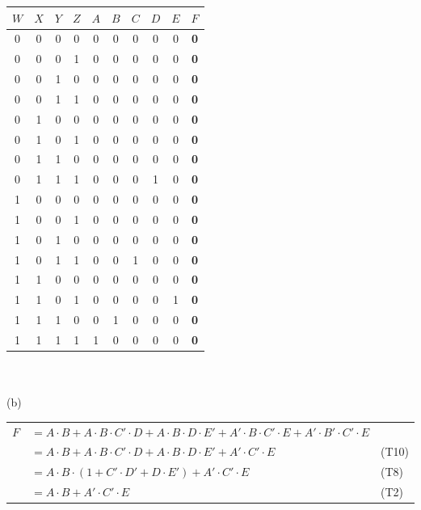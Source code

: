 \begin{tabular}{cccc|ccccc|c}
  $W$ & $X$ & $Y$ & $Z$ & $A$ & $B$ & $C$ & $D$ & $E$ & \textbf{$F$}\\
  \hline
   0  &  0  &  0  &  0  &  0  &  0  &  0  &  0  &  0  & \textbf{ 0 }\\
   0  &  0  &  0  &  1  &  0  &  0  &  0  &  0  &  0  & \textbf{ 0 }\\
   0  &  0  &  1  &  0  &  0  &  0  &  0  &  0  &  0  & \textbf{ 0 }\\
   0  &  0  &  1  &  1  &  0  &  0  &  0  &  0  &  0  & \textbf{ 0 }\\
   0  &  1  &  0  &  0  &  0  &  0  &  0  &  0  &  0  & \textbf{ 0 }\\
   0  &  1  &  0  &  1  &  0  &  0  &  0  &  0  &  0  & \textbf{ 0 }\\
   0  &  1  &  1  &  0  &  0  &  0  &  0  &  0  &  0  & \textbf{ 0 }\\
   0  &  1  &  1  &  1  &  0  &  0  &  0  &  1  &  0  & \textbf{ 0 }\\
   1  &  0  &  0  &  0  &  0  &  0  &  0  &  0  &  0  & \textbf{ 0 }\\
   1  &  0  &  0  &  1  &  0  &  0  &  0  &  0  &  0  & \textbf{ 0 }\\
   1  &  0  &  1  &  0  &  0  &  0  &  0  &  0  &  0  & \textbf{ 0 }\\
   1  &  0  &  1  &  1  &  0  &  0  &  1  &  0  &  0  & \textbf{ 0 }\\
   1  &  1  &  0  &  0  &  0  &  0  &  0  &  0  &  0  & \textbf{ 0 }\\
   1  &  1  &  0  &  1  &  0  &  0  &  0  &  0  &  1  & \textbf{ 0 }\\
   1  &  1  &  1  &  0  &  0  &  1  &  0  &  0  &  0  & \textbf{ 0 }\\
   1  &  1  &  1  &  1  &  1  &  0  &  0  &  0  &  0  & \textbf{ 0 }\\
\end{tabular}\\ \\
(b)\\
\begin{tabular}{rll}
  $F$ & $=A \cdot B + A \cdot B \cdot C' \cdot D + A \cdot B \cdot D \cdot E' + A' \cdot B \cdot C' \cdot E + A' \cdot B' \cdot C' \cdot E$ &\\
      & $=A \cdot B + A \cdot B \cdot C' \cdot D + A \cdot B \cdot D \cdot E' + A' \cdot C' \cdot E$ & (T10)\\
      & $=A \cdot B \cdot (1 + C' \cdot D' + D \cdot E') + A' \cdot C' \cdot E$ & (T8)\\
      & $=A \cdot B + A' \cdot C' \cdot E$ & (T2)\\
\end{tabular}\\ \\
